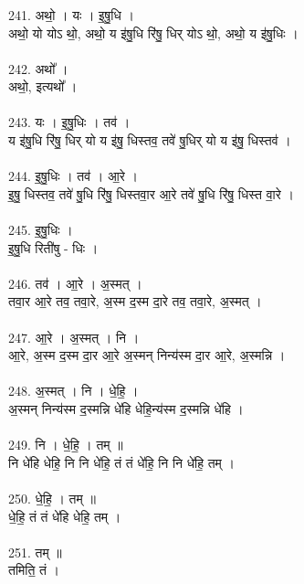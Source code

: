 \subsubsection{}
241. अथो॒ । यः । इ॒षु॒धि ।\\
अथो॒ यो योऽ थो॒, अथो॒ य इ॑षु॒धि रि॑षु॒ धिर् योऽ थो॒, अथो॒ य इ॑षु॒धिः ।\\
\\
242. अथो᳚ ।\\
अथो॒, इत्यथो᳚ ।\\
\\
243. यः । इ॒षु॒धिः । तव॑ ।\\
य इ॑षु॒धि रि॑षु॒ धिर् यो य इ॑षु॒ धिस्तव॒ तवे॑ षु॒धिर् यो य इ॑षु॒ धिस्तव॑ ।\\
\\
244. इ॒षु॒धिः । तव॑ । आ॒रे ।\\
इ॒षु॒ धिस्तव॒ तवे॑ षु॒धि रि॑षु॒ धिस्तवा॒र आ॒रे तवे॑ षु॒धि रि॑षु॒ धिस्त वा॒रे ।\\
\\
245. इ॒षु॒धिः ।\\
इ॒षु॒धि रिती॑षु - धिः ।\\
\\
246. तव॑ । आ॒रे । अ॒स्मत् ।\\
तवा॒र आ॒रे तव॒ तवा॒रे, अ॒स्म द॒स्म दा॒रे तव॒ तवा॒रे, अ॒स्मत् ।\\
\\
247. आ॒रे । अ॒स्मत् । नि ।\\
आ॒रे, अ॒स्म द॒स्म दा॒र आ॒रे अ॒स्मन् निन्य॑स्म दा॒र आ॒रे, अ॒स्मन्नि ।\\
\\
248. अ॒स्मत् । नि । धे॒हि॒ ।\\
अ॒स्मन् निन्य॑स्म द॒स्मन्नि धे॑हि धेहि॒न्य॑स्म द॒स्मन्नि धे॑हि ।\\
\\
249. नि । धे॒हि॒ । तम् ॥\\
नि धे॑हि धेहि॒ नि नि धे॑हि॒ तं तं धे॑हि॒ नि नि धे॑हि॒ तम् ।\\
\\
250. धे॒हि॒ । तम् ॥\\
धे॒हि॒ तं तं धे॑हि धेहि॒ तम् ।\\
\\
251. तम् ॥\\
तमिति॒ तं ।\\
